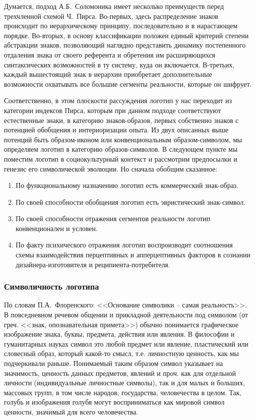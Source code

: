 Думается, подход А.Б.~Соломоника имеет несколько преимуществ перед трехчленной
схемой Ч.~Пирса. Во-первых, здесь распределение знаков происходит по
иерархическому принципу, последовательно и в нарастающем порядке. Во-вторых,
в основу классификации положен единый критерий степени абстракции знаков,
позволяющий наглядно представить динамику постепенного отдаления знака от
своего референта и обретения им расширяющихся синтаксических возможностей в ту
систему, куда он включается. В-третьих, каждый вышестоящий знак в иерархии
приобретает дополнительные возможности охватывать все большие сегменты реальности,
которые он шифрует.

Соответственно, в этом плоскости рассуждения логотип у нас переходит из категории
индексов Пирса, которым при данном подходе соответствуют естественные знаки,
в категорию знаков-образов, первых собственно знаков с потенцией обобщения и
интериоризации опыта. Из двух описанных выше потенций быть  образом-иконом
или конвенциональным образом-символом, мы определяем логотип в категорию
образов-символов. В следующем пункте мы поместим логотип в социокультурный
контекст и рассмотрим предпосылки и генезис его символической эволюции.
Но сначала обобщим сказанное:
\begin{enumerate}
\item По функциональному назначению логотип есть коммерческий знак-образ.
\item По своей способности обобщения логотип есть эвристический знак-символ.
\item По своей способности отражения сегментов реальности логотип конвенционален и условен.
\item По факту психического отражения логотип воспроизводит соотношения схемы
  взаимодействия перцептивных и апперцептивных факторов в сознании дизайнера-изготовителя
  и реципиента-потребителя.
\end{enumerate}

\subsubsection{Символичность логотипа}
По словам П.А.~Флоренского: <<Основание символики -- самая
реальность>>\autocite[425]{book:florensky1}. В повседневном речевом общении и прикладной
деятельности под символом (от греч. <<знак, опознавательная примета>>) обычно
понимается графическое изображение знака, буквы, предмета, действия или явления.
В философии и гуманитарных науках символ это любой предмет или явление,
пластический или словесный образ, который какой-то смысл, т.е. личностную ценность,
как мы подчеркивали раньше. Понимаемый таким образом символ указывает на значимость,
ценность данных предметов, явлений и проч. как для отдельной личности
(индивидуальные личностные символы), так и для малых и больших, массовых групп,
в том числе народов, государства, человечества в целом. Так, голубь и изображения
голубя могут восприниматься как мировой символ ценности, значимый для всего
человечества.

